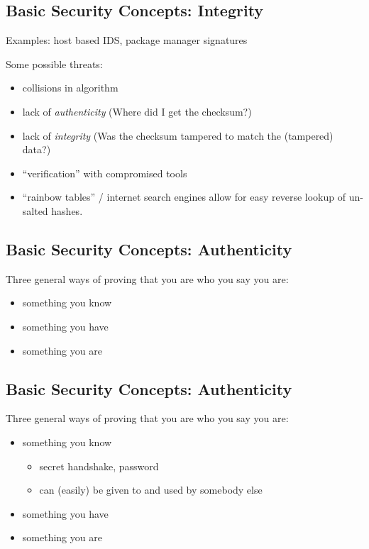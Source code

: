 \documentclass[xga]{xdvislides}
\begin{document}
\subsection{Basic Security Concepts: Integrity}
Examples: host based IDS, package manager signatures

\vspace{.5in}
Some possible threats:
\begin{itemize}
	\item collisions in algorithm
	\item lack of {\em authenticity} (Where did I get the checksum?)
	\item lack of {\em integrity} (Was the checksum tampered to match the (tampered) data?)
	\item ``verification'' with compromised tools
	\item ``rainbow tables'' / internet search engines allow for easy reverse
		lookup of un-salted hashes.
\end{itemize}

\subsection{Basic Security Concepts: Authenticity}
Three general ways of proving that you are who you say you are:
\begin{itemize}
	\item something you know
	\item something you have
	\item something you are
\end{itemize}

\subsection{Basic Security Concepts: Authenticity}
Three general ways of proving that you are who you say you are:
\begin{itemize}
	\item something you know
		\begin{itemize}
			\item secret handshake, password
			\item can (easily) be given to and used by somebody else
		\end{itemize}
	\item something you have
	\item something you are
\end{itemize}
\end{document}

